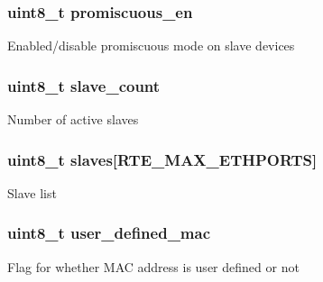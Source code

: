 \subsubsection[{promiscuous\+\_\+en}]{\setlength{\rightskip}{0pt plus 5cm}uint8\+\_\+t promiscuous\+\_\+en}\label{structbond__dev__private_a1116c885f822943f992ed455f278671e}
Enabled/disable promiscuous mode on slave devices \hypertarget{structbond__dev__private_ae245bc94feb81da053cc77f63abc07e2}{}
\subsubsection[{slave\+\_\+count}]{\setlength{\rightskip}{0pt plus 5cm}uint8\+\_\+t slave\+\_\+count}\label{structbond__dev__private_ae245bc94feb81da053cc77f63abc07e2}
Number of active slaves \hypertarget{structbond__dev__private_aabe27a69cb59cc9e6a45c0f59a941cf9}{}
\subsubsection[{slaves}]{\setlength{\rightskip}{0pt plus 5cm}uint8\+\_\+t slaves\mbox{[}R\+T\+E\+\_\+\+M\+A\+X\+\_\+\+E\+T\+H\+P\+O\+R\+T\+S\mbox{]}}\label{structbond__dev__private_aabe27a69cb59cc9e6a45c0f59a941cf9}
Slave list \hypertarget{structbond__dev__private_a1eb4891c38992140bd42386262d54e1b}{}
\subsubsection[{user\+\_\+defined\+\_\+mac}]{\setlength{\rightskip}{0pt plus 5cm}uint8\+\_\+t user\+\_\+defined\+\_\+mac}\label{structbond__dev__private_a1eb4891c38992140bd42386262d54e1b}
Flag for whether M\+A\+C address is user defined or not \hypertarget{structbond__dev__private_a70188fdb8ba685a9505871dd8622d7fe}{}
